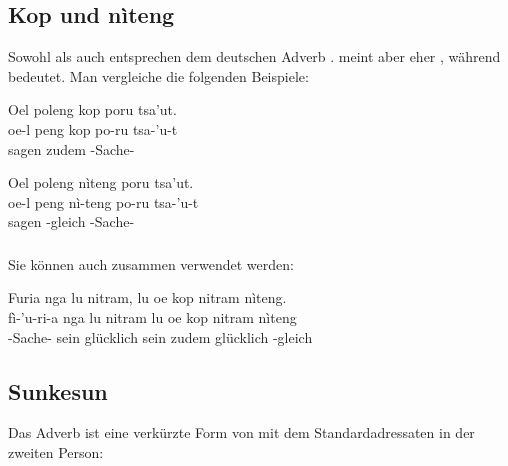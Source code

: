 \subsection{Kop und nìteng} Sowohl  als auch  entsprechen dem deutschen Adverb .  meint aber eher , während   bedeutet. Man vergleiche die folgenden Beispiele:

\begin{interlin}
	\glll Oel poleng kop poru tsa'ut. \\
	oe-l peng kop po-ru tsa-'u-t \\
	 sagen zudem  -Sache- \\
\end{interlin}

\begin{interlin}
	\glll Oel poleng nìteng poru tsa'ut. \\
	oe-l peng nì-teng po-ru tsa-'u-t \\
	 sagen -gleich  -Sache- \\
\end{interlin}

\subsubsection{} Sie können auch zusammen verwendet werden:

\begin{interlin}
	\glll \Npawl{}Furia nga lu nitram, lu oe kop nitram nìteng. \\
	fì-'u-ri-a nga lu nitram lu oe kop nitram nìteng \\
	-Sache-  sein glücklich sein  zudem glücklich -gleich \\
\end{interlin}


\subsection{Sunkesun} Das Adverb   ist eine verkürzte Form von  mit dem Standardadressaten in der zweiten Person:

